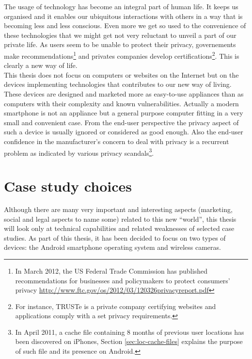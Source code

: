 The usage of technology has become an integral part of human life.
It keeps us organised and it enables our ubiquitous interactions with others in a way that is becoming less and less conscious.
Even more we get so used to the convenience of these technologies that we might get not very reluctant to unveil a part of our private life.
As users seem to be unable to protect their privacy, governements make recommendations\footnote{In March 2012, the US Federal Trade Commission has published recommendations for businesses and policymakers to protect consumers' privacy \url{http://www.ftc.gov/os/2012/03/120326privacyreport.pdf}} and privates companies develop certifications\footnote{For instance, TRUSTe is a private company certifying websites and applications comply with a set privacy requirements.}.
This is clearly a new way of life.\\

This thesis does not focus on computers or websites on the Internet but on the devices implementing technologies that contributes to our new way of living.
These devices are designed and marketed more as easy-to-use appliances than as computers with their complexity and known vulnerabilities.
Actually a modern smartphone is not an appliance but a general purpose computer fitting in a very small and convenient case.
From the end-user perspective the privacy aspect of such a device is usually ignored or considered as good enough.
Also the end-user confidence in the manufacturer’s concern to deal with privacy is a recurrent problem as indicated by various privacy scandals\footnote{In April 2011, a cache file containing 8 months of previous user locations has been discovered on iPhones, Section \ref{sec:loc-cache-files} explains the purpose of such file and its presence on Android.}.\\

\section*{Case study choices}

Although there are many very important and interesting aspects (marketing, social and legal aspects to name some) related to this new ``world'', this thesis will look only at technical capabilities and related weaknesses of selected case studies.
As part of this thesis, it has been decided to focus on two types of devices: the Android smartphone operating system and wireless cameras.\\

